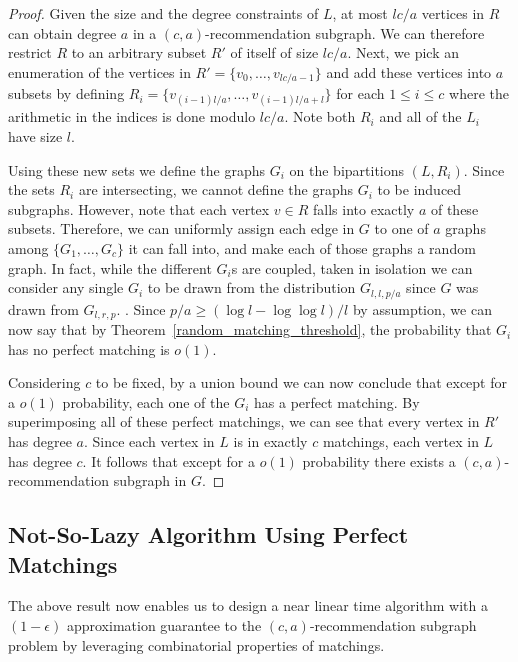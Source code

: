 \begin{proof}
Given the size and the degree constraints of $L$, at most $lc/a$
vertices in $R$ can obtain degree $a$ in a $(c,a)$-recommendation subgraph. We
can therefore restrict $R$ to an arbitrary subset $R'$ of itself of size $lc/a$.
Next, we pick an enumeration of the vertices in $R'=\{v_0,\ldots, v_{lc/a-1}\}$
and add these vertices into $a$ subsets by defining
$R_i = \{v_{(i-1)l/a}, \ldots, v_{(i-1)l/a+l}\}$ for each $1\leq i\leq c$ where
the arithmetic in the indices is done modulo $lc/a$. Note both $R_i$ and all of
the $L_i$ have size $l$. \vs

Using these new sets we define the graphs $G_i$ on the bipartitions
$(L, R_i)$. Since the sets $R_i$ are intersecting, we cannot define the
graphs $G_i$ to be induced subgraphs. However, note that each vertex $v\in R$
falls into exactly $a$ of these subsets. Therefore, we can uniformly assign each
edge in $G$ to one of $a$ graphs among $\{G_1,\ldots, G_c\}$ it can fall into,
and make each of those graphs a random graph. In fact, while the different
$G_i$s are coupled, taken in isolation we can consider any single $G_i$ to be
drawn from the distribution $G_{l,l,p/a}$ since $G$ was drawn from $G_{l,r,p}$.
\vs. Since $p/a \geq (\log l - \log\log l)/l$ by assumption, we can now say that by
Theorem~\ref{random_matching_threshold}, the probability that $G_i$ has no perfect
matching is $o(1)$. \vs

Considering $c$ to be fixed, by a union bound we can now conclude that except
for a $o(1)$ probability, each one of the $G_i$ has a perfect matching. By
superimposing all of these perfect matchings, we can see that every vertex in
$R'$ has degree $a$. Since each vertex in $L$ is in exactly $c$ matchings, each
vertex in $L$ has degree $c$. It follows that except for a $o(1)$ probability
 there exists a $(c,a)$-recommendation subgraph in $G$.
\end{proof}

\subsection{Not-So-Lazy Algorithm Using Perfect Matchings}

The above result now enables us to design a near linear time
algorithm with a $(1-\epsilon)$ approximation guarantee
to the $(c,a)$-recommendation subgraph problem by leveraging
combinatorial properties of matchings.

